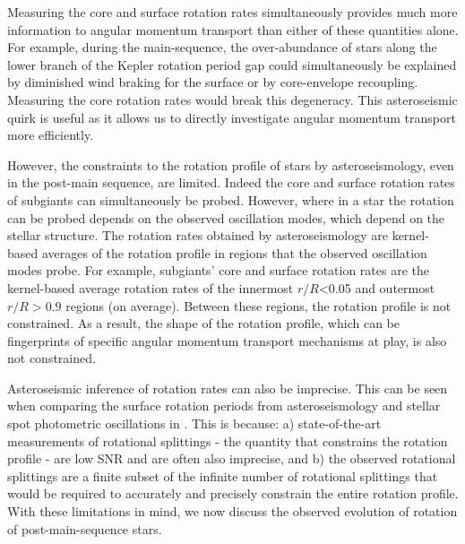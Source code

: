 Measuring the core and surface rotation rates simultaneously provides much more information to angular momentum transport than either of these quantities alone.
For example, during the main-sequence, the over-abundance of stars along the lower branch of the Kepler rotation period gap could simultaneously be explained by diminished wind braking for the surface or by core-envelope recoupling.
Measuring the core rotation rates would break this degeneracy.
This asteroseismic quirk is useful as it allows us to directly investigate angular momentum transport more efficiently.

However, the constraints to the rotation profile of stars by asteroseismology, even in the post-main sequence, are limited.
Indeed the core and surface rotation rates of subgiants can simultaneously be probed.
However, where in a star the rotation can be probed depends on the observed oscillation modes, which depend on the stellar structure.
The rotation rates obtained by asteroseismology are kernel-based averages of the rotation profile in regions that the observed oscillation modes probe.
For example, subgiants' core and surface rotation rates are the kernel-based average rotation rates of the innermost $r/R$<0.05 and outermost $r/R>0.9$ regions (on average).
Between these regions, the rotation profile is not constrained.
As a result, the shape of the rotation profile, which can be fingerprints of specific angular momentum transport mechanisms at play, is also not constrained.

Asteroseismic inference of rotation rates can also be imprecise.
This can be seen when comparing the surface rotation periods from asteroseismology and stellar spot photometric oscillations in \citet{hall_weakened_2021}.
This is because: a) state-of-the-art measurements of rotational splittings - the quantity that constrains the rotation profile - are low SNR and are often also imprecise, and b) the observed rotational splittings are a finite subset of the infinite number of rotational splittings that would be required to accurately and precisely constrain the entire rotation profile.
With these limitations in mind, we now discuss the observed evolution of rotation of post-main-sequence stars.

